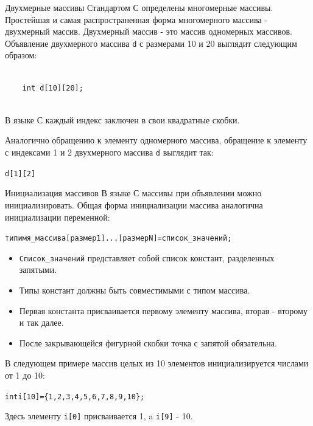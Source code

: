 \documentclass{beamer}
\begin{document}
\begin{frame}[fragile]{Двухмерные массивы}
    Стандартом С определены многомерные массивы. Простейшая и самая распространенная форма многомерного массива - двухмерный массив. 
    \medskip
    Двухмерный массив - это массив одномерных массивов. Объявление двухмерного массива \texttt{d} с размерами 10 и 20 выглядит
    следующим образом:

    \medskip
    \begin{verbatim}
    
    int d[10][20];
    
    \end{verbatim}
    \medskip
    В языке С каждый индекс заключен в свои квадратные скобки. 
    \medskip
    
    Аналогично обращению к элементу одномерного массива, обращение к элементу с индексами 1 и 2 двухмерного массива \texttt{d} выглядит так:
    
    \begin{alltt}
    d[1][2]
    \end{alltt}
\end{frame}

\begin{frame}{Инициализация массивов}
    В языке С массивы при объявлении можно инициализировать. Общая
    форма инициализации массива аналогична инициализации переменной:
    
    \begin{alltt}
    тип имя\_массива[размер1]...[размерN] = {список\_значений};
    \end{alltt}
    \begin{itemize}
        \item \texttt{Список\_значений} представляет собой список констант, разделенных запятыми. 
        \item Типы констант должны быть совместимыми с типом массива. 
        \item Первая константа присваивается первому элементу массива, вторая - второму и так далее. 
        \item После закрывающейся фигурной скобки точка с запятой обязательна.
    \end{itemize}
    
    В следующем примере массив целых из 10 элементов инициализируется числами от 1 до 10:
    
    \begin{alltt}
    int i[10] = \{1, 2, 3, 4, 5, 6, 7, 8, 9, 10\};
    \end{alltt}
    
    Здесь элементу \texttt{i[0]} присваивается 1, a \texttt{i[9]} - 10.
\end{frame}
\end{document}
